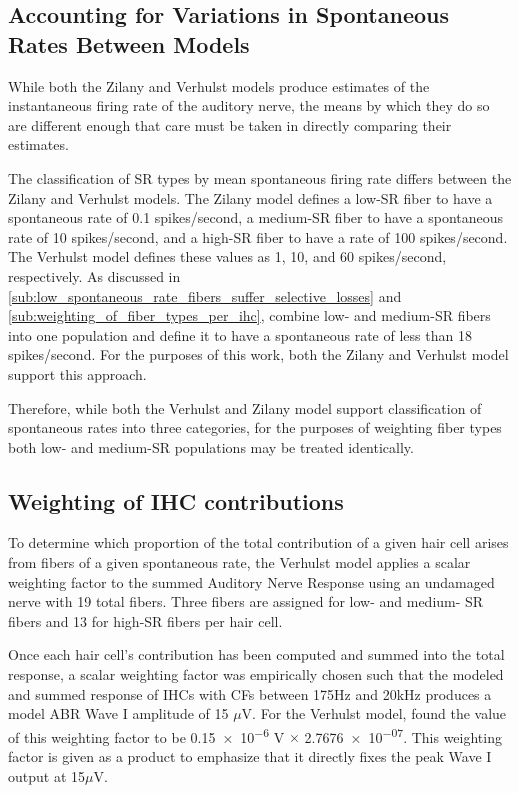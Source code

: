 \subsection{Accounting for Variations in Spontaneous Rates Between Models} %
\label{sub:interoperability_of_the_zilany_and_verhulst_models}
While both the Zilany and Verhulst models produce estimates of the instantaneous firing rate of the auditory nerve, the means by which they do so are different enough that care must be taken in directly comparing their estimates.  

The classification of SR types by mean spontaneous firing rate differs between the Zilany and Verhulst models.  The Zilany model defines a low-SR fiber to have a spontaneous rate of 0.1 spikes/second, a medium-SR fiber to have a spontaneous rate of 10 spikes/second, and a high-SR fiber to have a rate of 100 spikes/second.  The Verhulst model defines these values as 1, 10, and 60 spikes/second, respectively.  As discussed in \autoref{sub:low_spontaneous_rate_fibers_suffer_selective_losses} and \autoref{sub:weighting_of_fiber_types_per_ihc}, \cite{Temchin2008Threshold} combine low- and medium-SR fibers into one population and define it to have a spontaneous rate of less than 18 spikes/second.  For the purposes of this work, both the Zilany and Verhulst model support this approach.  

Therefore, while both the Verhulst and Zilany model support classification of spontaneous rates into three categories, for the purposes of weighting fiber types both low- and medium-SR populations may be treated identically.  

\subsection{Weighting of IHC contributions} %
\label{sub:weighting_of_ihc_contribution}
To determine which proportion of the total contribution of a given hair cell arises from fibers of a given spontaneous rate, the Verhulst model applies a scalar weighting factor to the summed Auditory Nerve Response using an undamaged nerve with 19 total fibers. Three fibers are assigned for low- and medium- SR fibers and 13 for high-SR fibers per hair cell. 

Once each hair cell's contribution has been computed and summed into the total response,  a scalar weighting factor was empirically chosen such that the modeled and summed response of IHCs with CFs between 175Hz and 20kHz produces a model ABR Wave I amplitude of 15 $\mu$V.  For the Verhulst model, \cite{Verhulst2015Functional} found the value of this weighting factor to be \num{0.15e-6} V $\times$ \num{2.7676e-07}.  This weighting factor is given as a product to emphasize that it directly fixes the peak Wave I output at 15$\mu$V. 

